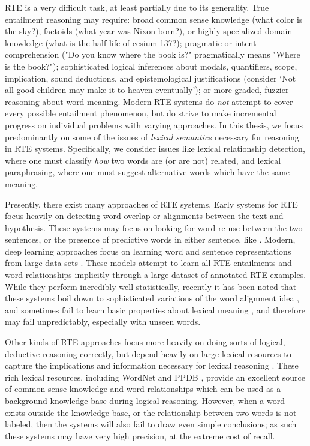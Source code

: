 RTE is a very difficult task, at least partially due to its generality.  True
entailment reasoning may require: broad common sense knowledge (what color is
the sky?), factoids (what year was Nixon born?), or highly specialized domain
knowledge (what is the half-life of cesium-137?); pragmatic or intent
comprehension ("Do you know where the book is?" pragmatically means "Where is
the book?"); sophisticated logical inferences about modals, quantifiers, scope,
implication, sound deductions, and epistemological justifications (consider
`Not all good children may make it to heaven eventually'); or more graded,
fuzzier reasoning about word meaning. Modern RTE systems do {\em not} attempt
to cover every possible entailment phenomenon, but do strive to make
incremental progress on individual problems with varying approaches. In this
thesis, we focus predominantly on some of the issues of {\em lexical semantics}
necessary for reasoning in RTE systems. Specifically, we consider issues like
lexical relationship detection, where one must classify {\em how} two words are
(or are not) related, and lexical paraphrasing, where one must suggest
alternative words which have the same meaning.

Presently, there exist many approaches of RTE systems. Early systems for RTE
focus heavily on detecting word overlap or alignments between the text and
hypothesis. These systems may focus on looking for word re-use between the
two sentences, or the presence of predictive words in either sentence, like
 \cite{dagan:2006:mlc}. Modern, deep learning approaches focus
on learning word and sentence representations from large data sets
\cite{bowman:2015:emnlp,cheng:2016:emnlp,bowman:2016:acl,mou:2016:acl,rocktaschel:2016:iclr,vendrov:2016:iclr}.
These models attempt to learn all RTE entailments and word relationships
implicitly through a large dataset of annotated RTE examples. While they
perform incredibly well statistically, recently it has been noted that these
systems boil down to sophisticated variations of the word alignment idea
\cite{parikh:2016:emnlp}, and sometimes fail to learn basic properties about
lexical meaning \cite{pavlick:2016:acl}, and therefore may fail unpredictably,
especially with unseen words.

Other kinds of RTE approaches focus more heavily on doing sorts of logical,
deductive reasoning correctly, but depend heavily on large lexical resources to
capture the implications and information necessary for lexical reasoning
\cite{maccartney:2008:coling,bjerva:2014:semeval,beltagy:2016:cl}. These rich
lexical resources, including WordNet \cite{miller:1995:acm} and PPDB
\cite{ganitkevitch:2013:naacl}, provide an excellent source of common sense
knowledge and word relationships which can be used as a background
knowledge-base during logical reasoning. However, when a word exists outside
the knowledge-base, or the relationship between two words is not labeled, then
the systems will also fail to draw even simple conclusions; as such these
systems may have very high precision, at the extreme cost of recall.

